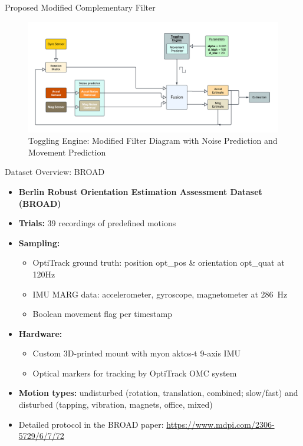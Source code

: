 \documentclass[aspectratio=169,xcolor=dvipsnames]{beamer}
\begin{document}
\begin{frame}{Proposed Modified Complementary Filter}
\begin{figure}
    \centering
    \includegraphics[width=1\linewidth]{logos/workflownew.png}
    \caption{Toggling Engine: Modified Filter Diagram with Noise Prediction and Movement Prediction}
    \label{fig:twinboost}
\end{figure}
\end{frame}



\begin{frame}{Dataset Overview: BROAD}
\begin{itemize}
  \item<1-> \textbf{Berlin Robust Orientation Estimation Assessment Dataset (BROAD)} \cite{BROAD}
  \item<2-> \textbf{Trials:} 39 recordings of predefined motions
  \item<3-> \textbf{Sampling:}
    \begin{itemize}
      \item OptiTrack ground truth: position {opt\_pos} \& orientation {opt\_quat} at 120Hz
      \item IMU MARG data: accelerometer, gyroscope, magnetometer at \SI{286}{Hz}
      \item Boolean movement flag per timestamp
    \end{itemize}
  \item<4-> \textbf{Hardware:}
    \begin{itemize}
      \item Custom 3D-printed mount with myon aktos-t 9-axis IMU
      \item Optical markers for tracking by OptiTrack OMC system
    \end{itemize}
  \item<5-> \textbf{Motion types:} undisturbed (rotation, translation, combined; slow/fast) and disturbed (tapping, vibration, magnets, office, mixed)
  \item<6-> Detailed protocol in the BROAD paper: \url{https://www.mdpi.com/2306-5729/6/7/72}
\end{itemize}
\end{frame}
\end{document}
